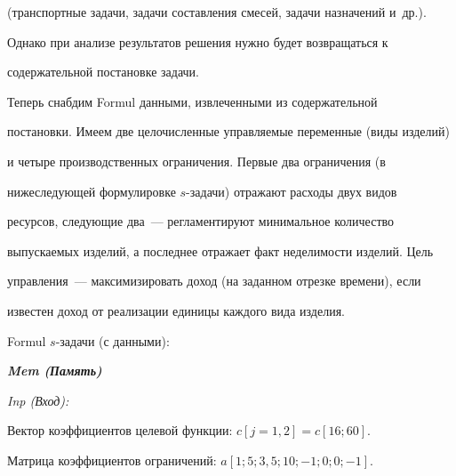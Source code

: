(транспортные задачи, задачи составления смесей, задачи назначений и~др.).


Однако при анализе результатов решения нужно будет возвращаться к


содержательной постановке задачи.





  Теперь снабдим Formul данными, извлеченными из содержательной


постановки. Имеем две целочисленные управляемые переменные (виды изделий)


и четыре производственных ограничения. Первые два ограничения (в


ни\-же\-сле\-ду\-ющей формулировке $s$-за\-да\-чи) отражают расходы двух видов


ресурсов, сле\-ду\-ющие два~--- регламентируют минимальное количество


выпускаемых изделий, а последнее отражает факт неделимости изделий. Цель


управления~--- максимизировать доход (на заданном отрезке времени), если


известен доход от реализации единицы каждого вида изделия.





\smallskip





  Formul $s$-задачи (с данными):





  \smallskip





  {\bfseries\textit{Mem (Память)}}





  \textit{Inp (Вход):}





\noindent


Вектор коэффициентов целевой функции: $c[j=1, 2] = c[16; 60]$.





\noindent


Матрица коэффициентов ограничений: $a[1; 5; 3{,}5; 10; -1; 0; 0; -1]$.








